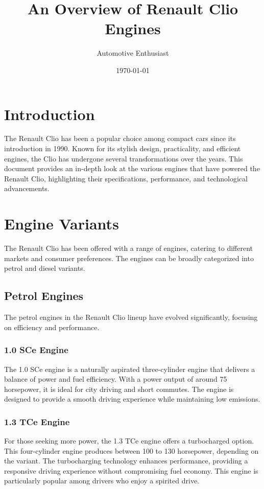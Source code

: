 \documentclass{article}
\title{An Overview of Renault Clio Engines}
\author{Automotive Enthusiast}
\date{\today}
\begin{document}
\maketitle

\section{Introduction}
The Renault Clio has been a popular choice among compact cars since its introduction in 1990. Known for its stylish design, practicality, and efficient engines, the Clio has undergone several transformations over the years. This document provides an in-depth look at the various engines that have powered the Renault Clio, highlighting their specifications, performance, and technological advancements.

\section{Engine Variants}
The Renault Clio has been offered with a range of engines, catering to different markets and consumer preferences. The engines can be broadly categorized into petrol and diesel variants.

\subsection{Petrol Engines}
The petrol engines in the Renault Clio lineup have evolved significantly, focusing on efficiency and performance. 

\subsubsection{1.0 SCe Engine}
The 1.0 SCe engine is a naturally aspirated three-cylinder engine that delivers a balance of power and fuel efficiency. With a power output of around 75 horsepower, it is ideal for city driving and short commutes. The engine is designed to provide a smooth driving experience while maintaining low emissions.

\subsubsection{1.3 TCe Engine}
For those seeking more power, the 1.3 TCe engine offers a turbocharged option. This four-cylinder engine produces between 100 to 130 horsepower, depending on the variant. The turbocharging technology enhances performance, providing a responsive driving experience without compromising fuel economy. This engine is particularly popular among drivers who enjoy a spirited drive.
\end{document}
